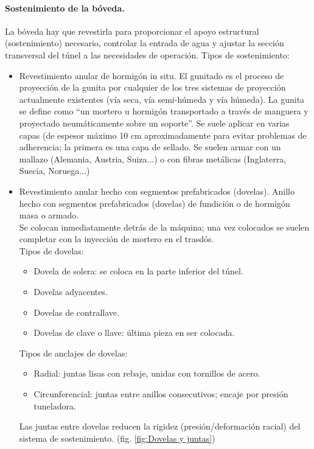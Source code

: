 \paragraph{Sostenimiento de la bóveda.}
La bóveda hay que revestirla para proporcionar el apoyo estructural (sostenimiento) necesario, controlar la entrada de agua y ajustar la sección transversal del túnel a las necesidades de operación. Tipos de sostenimiento:
\begin{itemize}
    \item Revestimiento anular de hormigón in situ.
    El gunitado es el proceso de proyección de la gunita por cualquier de los tres sistemas de proyección actualmente existentes (vía seca, vía semi-húmeda y vía húmeda). La gunita se define como ``un mortero u hormigón transportado a través de manguera y proyectado neumáticamente sobre un soporte''. Se suele aplicar en varias capas (de espesor máximo 10 cm aproximadamente para evitar problemas de adherencia; la primera es una capa de sellado. Se suelen armar con un mallazo (Alemania, Austria, Suiza...) o con fibras metálicas (Inglaterra, Suecia, Noruega...)
    
    \item Revestimiento anular hecho con segmentos prefabricados (dovelas).
    Anillo hecho con segmentos prefabricados (dovelas) de fundición o de hormigón masa o armado. \\
    Se colocan inmediatamente detrás de la máquina; una vez colocados se suelen completar con la inyección de mortero en el trasdós. \\
    Tipos de dovelas:
    \begin{itemize}
        \item Dovela de solera: se coloca en la parte inferior del túnel.
        \item Dovelas adyacentes.
        \item Dovelas de contrallave.
        \item Dovelas de clave o llave: última pieza en ser colocada.
    \end{itemize}
    Tipos de anclajes de dovelas:
    \begin{itemize}
        \item Radial: juntas lisas con rebaje, unidas con tornillos de acero.
        \item Circunferencial: juntas entre anillos consecutivos; encaje por presión tuneladora.
    \end{itemize}
    Las juntas entre dovelas reducen la rigidez (presión/deformación racial) del sistema de sostenimiento. (fig. \ref{fig:Dovelas y juntas})


\end{itemize}

